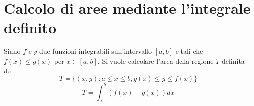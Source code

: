 \documentclass[12pt, a4paper]{report}
\begin{document}
    \section{Calcolo di aree mediante l'integrale definito}
    Siano $f$ e $g$ due funzioni integrabili sull'intervallo $[a,b]$ e tali che $f(x)\leq g(x)$ per $x\in [a,b]$. Si vuole calcolare l'area della regione $T$ definita da
    \begin{equation*}
        T=\{(x,y):a\leq x\leq b, g(x)\leq y\leq f(x)\}
    \end{equation*}
    \begin{equation*}
        T=\int_{a}^{b} (f(x)-g(x))dx
    \end{equation*}
\end{document}
